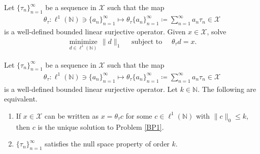 \documentclass[10pt,a4paper]{amsart}
\begin{document}
\begin{problem} \label{BP1}
	Let $\{\tau_n \}_{n=1}^\infty$ be a sequence in  $\mathcal{X}$ such that the map 
	\begin{align*}
		\theta_\tau:\ell^1(\mathbb{N})\ni \{a_n \}_{n=1}^\infty\mapsto \theta_\tau \{a_n \}_{n=1}^\infty\coloneqq \sum_{n=1}^{\infty}a_n\tau_n \in \mathcal{X} 
	\end{align*}
	is a well-defined bounded linear surjective operator. Given $x \in \mathcal{X}$, solve 	
	\begin{align*}
		\underset{d\in \ell^1(\mathbb{N})}{\operatorname{minimize}}\,\|d\|_1 \quad \text{ subject to } \quad \theta_\tau d=x.
	\end{align*}
\end{problem}

\begin{lemma}\label{IFF}
Let $\{\tau_n \}_{n=1}^\infty$ be a sequence in  $\mathcal{X}$ such that the map 
\begin{align*}
	\theta_\tau:\ell^1(\mathbb{N})\ni \{a_n \}_{n=1}^\infty\mapsto \theta_\tau \{a_n \}_{n=1}^\infty\coloneqq \sum_{n=1}^{\infty}a_n\tau_n \in \mathcal{X} 
\end{align*}
is a well-defined bounded linear surjective operator. Let $k \in \mathbb{N}$.
 The following are equivalent.
\begin{enumerate}[\upshape(i)]
	\item  If $x \in \mathcal{X}$ can be written as  $	x=\theta_\tau c$ for some  $c \in \ell^1(\mathbb{N})$ with $\|c\|_0\leq k$, then $c$ is the unique solution to Problem \ref{BP1}.
	\item $ \{\tau_n \}_{n=1}^\infty$  satisfies the  null space property  of order $k$.
\end{enumerate}	
\end{lemma}
\end{document}
